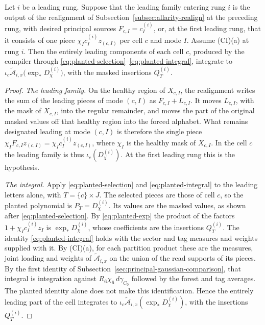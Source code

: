 \begin{lemma}
\label{lem:allarity-common-insertion-realigned}
Let $i$ be a leading rung. Suppose that the leading family entering rung
$i$ is the output of the realignment of
Subsection~\ref{subsec:allarity-realign} at the preceding rung, with
desired principal sources $F_{c,I}=c^{(i)}_I$, or, at the first leading
rung, that it consists of one piece $\chi_Ic^{(i)}_Iz_{(c,I)}$ per cell
$c$ and mode $I$. Assume (CI)(a) at rung $i$. Then the entirely leading
components of each cell $c$, produced by the compiler through
\eqref{eq:planted-selection}--\eqref{eq:planted-integral}, integrate to
$\iota_c\widetilde{\mathcal A}_{i,x}\bigl(\exp_*D^{(i)}_\chi\bigr)$, with
the masked insertions $Q^{(i)}_T$.
\end{lemma}
\begin{proof}
\emph{The leading family.} On the healthy region of $X_{c,I}$, the
realignment writes the sum of the leading pieces of mode $(c,I)$ as
$F_{c,I}+L_{c,I}$. It moves $L_{c,I}$, with the mask of $X_{c,I}$, into
the regular remainder, and moves the part of the original masked values
off that healthy region into the forced alphabet. What remains designated
leading at mode $(c,I)$ is therefore the single piece
$\chi_IF_{c,I}z_{(c,I)}=\chi_Ic^{(i)}_Iz_{(c,I)}$, where $\chi_I$ is the
healthy mask of $X_{c,I}$. In the cell $c$ the leading family is thus
$\iota_c(D^{(i)}_\chi)$. At the first leading rung this is the
hypothesis.

\emph{The integral.} Apply \eqref{eq:planted-selection} and
\eqref{eq:planted-integral} to the leading letters alone, with
$T=\{c\}\times J$. The selected pieces are those of cell $c$, so the planted
polynomial is $P_T=D^{(i)}_\chi$. Its values are the masked values, as
shown after \eqref{eq:planted-selection}. By \eqref{eq:planted-exp} the
product of the factors $1+\chi_Ic^{(i)}_Iz_I$ is $\exp_*D^{(i)}_\chi$,
whose coefficients are the insertions $Q^{(i)}_T$. The identity
\eqref{eq:planted-integral} holds with the sector and tag measures and
weights supplied with it. By (CI)(a), for each partition product these
are the measures, joint loading and weights of
$\widetilde{\mathcal A}_{i,x}$ on the union of the read supports of its
pieces. By the first identity of
Subsection~\ref{sec:principal-gaussian-comparison}, that integral is
integration against $R_6\chi_6\,d\gamma_{C_0}$ followed by the forest and
tag averages. The planted identity alone does not make this
identification. Hence the entirely leading
part of the cell integrates to
$\iota_c\widetilde{\mathcal A}_{i,x}(\exp_*D^{(i)}_\chi)$, with the
insertions $Q^{(i)}_T$.
\end{proof}

